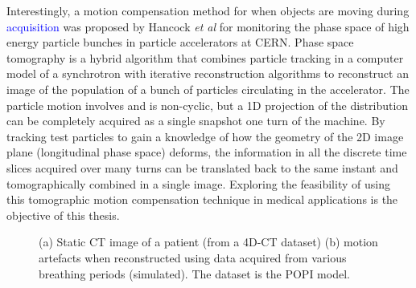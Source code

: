 Interestingly, a motion compensation method for when objects are moving during \textcolor{blue}{acquisition} was proposed by Hancock \textit{et al}\cite{pst1}\cite{pst2}\cite{pstweb} for monitoring the phase space of high energy particle bunches in particle accelerators at CERN. Phase space tomography is a hybrid algorithm that combines particle tracking in a computer model of a synchrotron with iterative reconstruction algorithms to reconstruct an image of the population of a bunch of particles circulating in the accelerator. The particle motion involves  and is non-cyclic, but a 1D projection of the distribution can be completely acquired as a single snapshot  one turn of the machine. By tracking test particles to gain a knowledge of how the geometry of the 2D image plane (longitudinal phase space) deforms, the information in all the discrete time slices acquired over many turns can be translated back to the same instant and tomographically combined in a single image.  Exploring the feasibility of using this tomographic motion compensation technique in medical applications is the objective of this thesis.

\begin{figure}

\begin{center} 
 
\caption[Motion blurr in lung CBCT]{\label{fig:motionblurr}(a) Static CT image of a patient (from a 4D-CT dataset) (b) motion artefacts when reconstructed using data acquired from various breathing periods (simulated). The dataset is the POPI model\cite{popi-modelweb}.}
\end{center} 
\end{figure}


